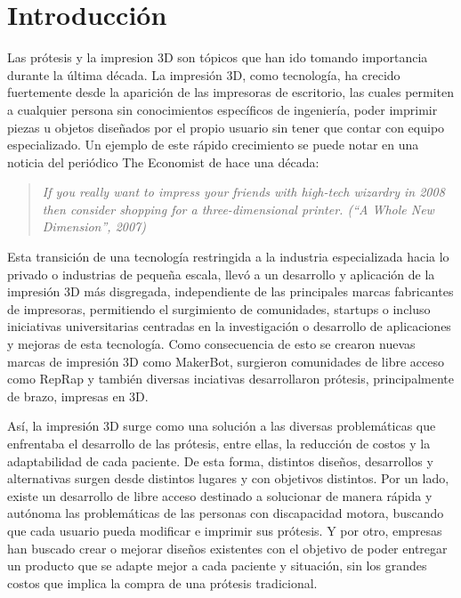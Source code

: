 \chapter{Introducción}

Las prótesis y la impresion 3D son tópicos que han ido tomando importancia durante la última década. La impresión 3D, como tecnología, ha crecido fuertemente desde la aparición de las impresoras de escritorio, las cuales permiten a cualquier persona sin conocimientos específicos de ingeniería, poder imprimir piezas u objetos diseñados por el propio usuario sin tener que contar con equipo especializado. Un ejemplo de este rápido crecimiento se puede notar en una noticia del periódico The Economist de hace una década: 

\begin{quote}
\textit{If you really want to impress your friends with high-tech wizardry in 2008 then consider shopping for a three-dimensional printer. (``A Whole New Dimension'', 2007)}
\end{quote}


Esta transición de una tecnología restringida a la industria especializada hacia lo privado o industrias de pequeña escala, llevó a un desarrollo y aplicación de la impresión 3D más disgregada, independiente de las principales marcas fabricantes de impresoras, permitiendo el surgimiento de comunidades, startups o incluso iniciativas universitarias centradas en la investigación o desarrollo de aplicaciones y mejoras de esta tecnología. Como consecuencia de esto se crearon nuevas marcas de impresión 3D como MakerBot, surgieron comunidades de libre acceso como RepRap y también diversas inciativas desarrollaron prótesis, principalmente de brazo, impresas en 3D.

Así, la impresión 3D surge como una solución a las diversas problemáticas que enfrentaba el desarrollo de las prótesis, entre ellas, la reducción de costos y la adaptabilidad de cada paciente. De esta forma, distintos diseños, desarrollos y alternativas surgen desde distintos lugares y con objetivos distintos. Por un lado, existe un desarrollo de libre acceso destinado a solucionar de manera rápida y autónoma las problemáticas de las personas con discapacidad motora, buscando que cada usuario pueda modificar e imprimir sus prótesis. Y por otro, empresas han buscado crear o mejorar diseños existentes con el objetivo de poder entregar un producto que se adapte mejor a cada paciente y situación, sin los grandes costos que implica la compra de una prótesis tradicional.

